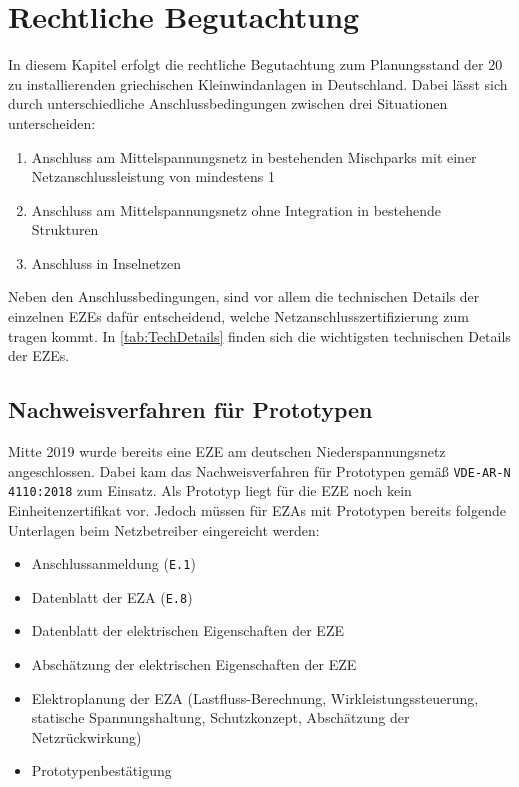 \section{Rechtliche Begutachtung}

In diesem Kapitel erfolgt die rechtliche Begutachtung zum Planungsstand der \num{20} zu installierenden griechischen Kleinwindanlagen in Deutschland. Dabei lässt sich durch unterschiedliche Anschlussbedingungen zwischen drei Situationen unterscheiden:

\begin{enumerate}
	\item Anschluss am Mittelspannungsnetz in bestehenden Mischparks mit einer Netzanschlussleistung von mindestens \SI{1}{\mw}
	\item Anschluss am Mittelspannungsnetz ohne Integration in bestehende Strukturen
	\item Anschluss in Inselnetzen
\end{enumerate}

Neben den Anschlussbedingungen, sind vor allem die technischen Details der einzelnen \glspl{EZE} dafür entscheidend, welche Netzanschlusszertifizierung zum tragen kommt. In \autoref{tab:TechDetails} finden sich die wichtigsten technischen Details der \glspl{EZE}.



\subsection{Nachweisverfahren für Prototypen}

Mitte \num{2019} wurde bereits eine \gls{EZE} am deutschen Niederspannungsnetz angeschlossen. Dabei kam das Nachweisverfahren für Prototypen gemäß \texttt{VDE-AR-N \num{4110}:\num{2018}} zum Einsatz. Als Prototyp liegt für die \gls{EZE} noch kein Einheitenzertifikat vor. Jedoch müssen für \glspl{EZA} mit Prototypen bereits folgende Unterlagen beim Netzbetreiber eingereicht werden:

\begin{itemize}
	\item Anschlussanmeldung (\texttt{E.1})
	\item Datenblatt der \gls{EZA} (\texttt{E.8})
	\item Datenblatt der elektrischen Eigenschaften der \gls{EZE}
	\item Abschätzung der elektrischen Eigenschaften der \gls{EZE}
	\item Elektroplanung der \gls{EZA} (Lastfluss-Berechnung, Wirkleistungssteuerung, statische Spannungshaltung, Schutzkonzept, Abschätzung der Netzrückwirkung)
	\item Prototypenbestätigung
\end{itemize}

